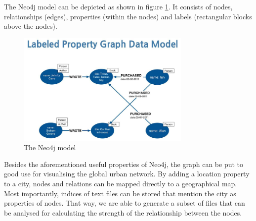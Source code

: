 The Neo4j model can be depicted as shown in figure \ref{fig:neo4j}. It consists of nodes, relationships (edges), properties (within the nodes) and labels (rectangular blocks above the nodes).

\begin{figure}
\centering
\includegraphics[width=0.75\textwidth]{neo4j}
\caption{The Neo4j model}
\label{fig:neo4j}
\end{figure}

Besides the aforementioned useful properties of Neo4j, the graph can be put to good use for visualising the global urban network. By adding a location property to a city, nodes and relations can be mapped directly to a geographical map. Most importantly, indices of text files can be stored that mention the city as properties of nodes. That way, we are able to generate a subset of files that can be analysed for calculating the strength of the relationship between the nodes.









